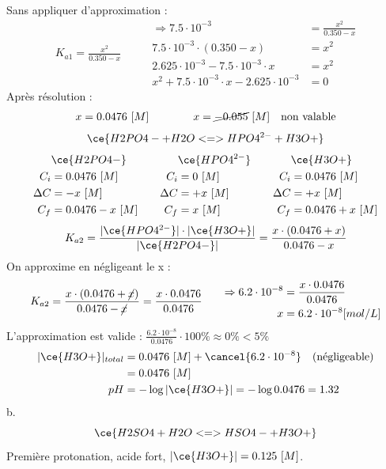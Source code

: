 \documentclass[
  11pt,
  french,
  a4paper,
  openany]{book}
\begin{document}
\begin{Answer}
Sans appliquer d'approximation :
\[
\begin{split}
K_{a1} = \frac{x^2}{0.350-x}
\end{split}
\qquad
\begin{split}
\Rightarrow 7.5 \cdot 10^{-3} &= \frac{x^2}{0.350-x} \\
7.5 \cdot 10^{-3} \cdot (0.350-x) &= x^2 \\
2.625 \cdot 10^{-3} - 7.5 \cdot 10^{-3} \cdot x &= x^2 \\
x^2 + 7.5 \cdot 10^{-3} \cdot x - 2.625 \cdot 10^{-3} &= 0
\end{split}
\]
Après résolution :
\[
\begin{split}
x = 0.0476\ [M]
\end{split}
\qquad\qquad
\begin{split}
x = \cancel{-0.055}\ [M] \quad \text{non valable}
\end{split}
\]
\[
\ce{H2PO4- + H2O <=> HPO4^{2-} + H3O+}
\]
\[
\begin{split}
&\ce{H2PO4-}\\
C_i &= 0.0476\ [M] \\
\Delta C &= - x\ [M] \\
C_f &= 0.0476 - x\ [M] \\
\end{split}
\qquad
\begin{split}
&\ce{HPO4^{2-}}\\
C_i &= 0\ [M] \\
\Delta C &= + x\ [M] \\
C_f &= x\ [M] \\
\end{split}
\qquad
\begin{split}
&\ce{H3O+}\\
C_i &= 0.0476\ [M] \\
\Delta C &= + x\ [M] \\
C_f &= 0.0476 + x\ [M] \\
\end{split}
\]
\[
K_{a2} = \frac{|\ce{HPO4^{2-}}| \cdot |\ce{H3O+}|}{|\ce{H2PO4-}|} = \frac{x \cdot (0.0476 + x)}{0.0476 - x}
\]
On approxime en négligeant le x :
\[
\begin{split}
K_{a2} = \frac{x \cdot (0.0476 + \cancel{x})}{0.0476 - \cancel{x}} = \frac{x \cdot 0.0476}{0.0476}
\end{split}
\qquad
\begin{split}
\Rightarrow 6.2 \cdot 10^{-8} &= \frac{x \cdot 0.0476}{0.0476} \\
x &= 6.2 \cdot 10^{-8} [mol/L]
\end{split}
\]
L'approximation est valide : \(\frac{6.2 \cdot 10^{-8}}{0.0476} \cdot 100\% \approx 0\% < 5\%\)
\[
\begin{split}
|\ce{H3O+}|_{total} &= 0.0476\ [M] + \cancel{6.2 \cdot 10^{-8}} \quad \text{(négligeable)} \\
&= 0.0476\ [M] \\
pH &= - \log |\ce{H3O+}| = - \log 0.0476 = 1.32
\end{split}
\]
b. \[
\ce{H2SO4 + H2O <=> HSO4- + H3O+}
\]
Première protonation, acide fort, \(|\ce{H3O+}| = 0.125\ [M]\).


\end{Answer}
\end{document}
